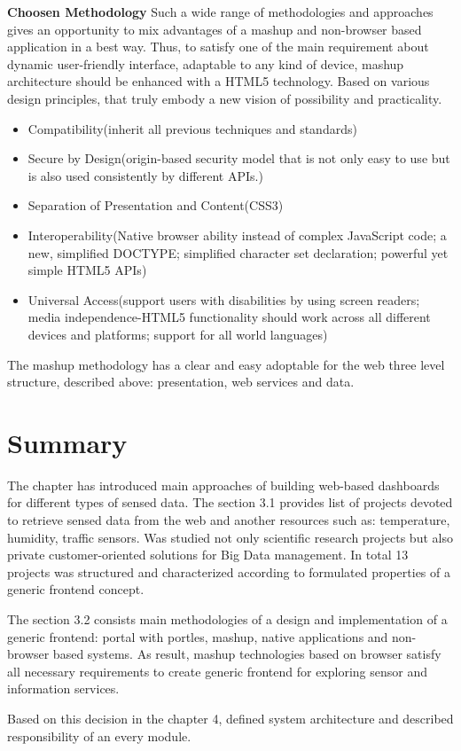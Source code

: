 \textbf{Choosen Methodology}
Such a wide range of methodologies and approaches gives an opportunity to mix advantages of a mashup and non-browser based application in a best way. Thus, to satisfy one of the main requirement about dynamic user-friendly interface, adaptable to any kind of device, mashup architecture should be enhanced with a HTML5 technology. Based on various design principles, that truly embody a new vision of possibility and practicality\cite{hickson2011html5}.
\begin{itemize}
\item Compatibility(inherit all previous techniques and standards)
\item Secure by Design(origin-based security model that is not only easy to use but is also used consistently by different APIs.)
\item Separation of Presentation and Content(CSS3)
\item Interoperability(Native browser ability instead of complex JavaScript code; a new, simplified DOCTYPE; simplified character set declaration; powerful yet simple HTML5 APIs)
\item Universal Access(support users with disabilities by using screen readers; media independence-HTML5 functionality should work across all different devices and platforms; support for all world languages)
\end{itemize}

The mashup methodology has a clear and easy adoptable for the web three level structure, described above: presentation, web services and data. 

\section{Summary}
The chapter has introduced main approaches of building web-based dashboards for different types of sensed data. The section 3.1 provides list of projects devoted to retrieve sensed data from the web and another resources such as: temperature, humidity, traffic sensors. Was studied not only scientific research projects but also private customer-oriented solutions for Big Data management. In total 13 projects was structured and characterized according to formulated properties of a generic frontend concept.

The section 3.2 consists main methodologies of a design and implementation of a generic frontend: portal with portles, mashup, native applications and non-browser based systems. As result, mashup technologies based on browser satisfy all necessary requirements to create generic frontend for exploring sensor and information services. 

Based on this decision in the chapter 4, defined system architecture and described responsibility of an every module. 